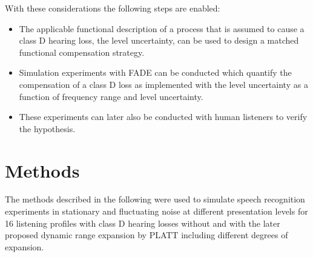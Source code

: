 \documentclass[10pt,a4paper,twocolumn]{article}
\begin{document}
With these considerations the following steps are enabled:
%
\begin{itemize}
	\item The applicable functional description of a process that is assumed to cause a class D hearing loss, the level uncertainty, can be used to design a matched functional compensation strategy.
	\item Simulation experiments with FADE can be conducted which quantify the compensation of a class D loss as implemented with the level uncertainty as a function of frequency range and level uncertainty.
	\item These experiments can later also be conducted with human listeners to verify the hypothesis.
\end{itemize}


\section*{Methods}
\label{sec:methods}
The methods described in the following were used to simulate speech recognition experiments in stationary and fluctuating noise at different presentation levels for 16 listening profiles with class D hearing losses without and with the later proposed dynamic range expansion by PLATT including different degrees of expansion.
\end{document}
